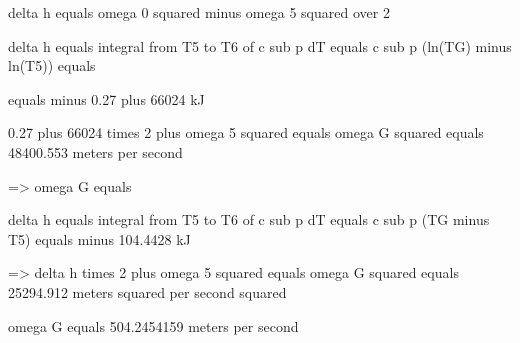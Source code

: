 delta h equals omega 0 squared minus omega 5 squared over 2

delta h equals integral from T5 to T6 of c sub p dT equals c sub p (ln(TG) minus ln(T5)) equals

equals minus 0.27 plus 66024 kJ

0.27 plus 66024 times 2 plus omega 5 squared equals omega G squared equals 48400.553 meters per second

=> omega G equals

delta h equals integral from T5 to T6 of c sub p dT equals c sub p (TG minus T5) equals minus 104.4428 kJ

=> delta h times 2 plus omega 5 squared equals omega G squared equals 25294.912 meters squared per second squared

omega G equals 504.2454159 meters per second
